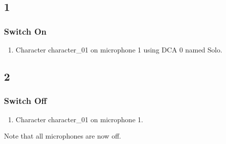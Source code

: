 \subsection* {1}
\subsubsection* {Switch On}
\begin{enumerate}
\item Character character\_01 on microphone 1 using DCA 0 named Solo.
\end{enumerate}
\subsection* {2}
\subsubsection* {Switch Off}
\begin{enumerate}
\item Character character\_01 on microphone 1.
\end{enumerate}
Note that all microphones are now off.
